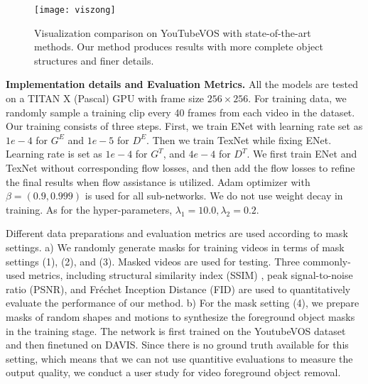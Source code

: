 \begin{figure}[t]
	\centering
	\texttt{[image: viszong]} %
	\caption{Visualization comparison on YouTubeVOS with state-of-the-art methods. Our method produces results with more complete object structures and finer details.  }
	\label{viszong}
\end{figure}






\noindent \textbf{Implementation details and Evaluation Metrics.} 
All the models are tested on a TITAN X (Pascal) GPU with frame size $256 \times 256$.
For training data, we randomly sample a training clip every 40 frames from each video in the dataset. Our training consists of three steps. First, we train ENet with learning rate set as $1e-4$ for $G^E$ and $1e-5$ for $D^E$. 
Then we train TexNet while fixing ENet. Learning rate is set as $1e-4$ for $G^T$, and $4e-4$ for $D^T$.
We first train ENet and TexNet without corresponding flow losses, and then add the flow losses to refine the final results when flow assistance is utilized.
Adam optimizer with $\beta=(0.9, 0.999)$ is used for all sub-networks.
We do not use weight decay in training.
As for the hyper-parameters, $\lambda_1=10.0,\lambda_2=0.2$.

Different data preparations and evaluation metrics are used according to mask settings. a) We randomly generate masks for training videos in terms of mask settings (1), (2), and (3). Masked videos are used for testing.
Three commonly-used metrics, including structural similarity index (SSIM) \cite{wang2004image}, peak signal-to-noise ratio (PSNR), and Fr{\'e}chet Inception Distance (FID) \cite{heusel2017gans} are used to quantitatively evaluate the performance of our method. 
b) For the mask setting (4), we prepare masks of random shapes and motions to synthesize the foreground object masks in the training stage. The network is first trained on the YoutubeVOS dataset and then finetuned on DAVIS. Since there is no ground truth available for this setting, which means that we can not use quantitive evaluations to measure the output quality, we conduct a user study for video foreground object removal.  




